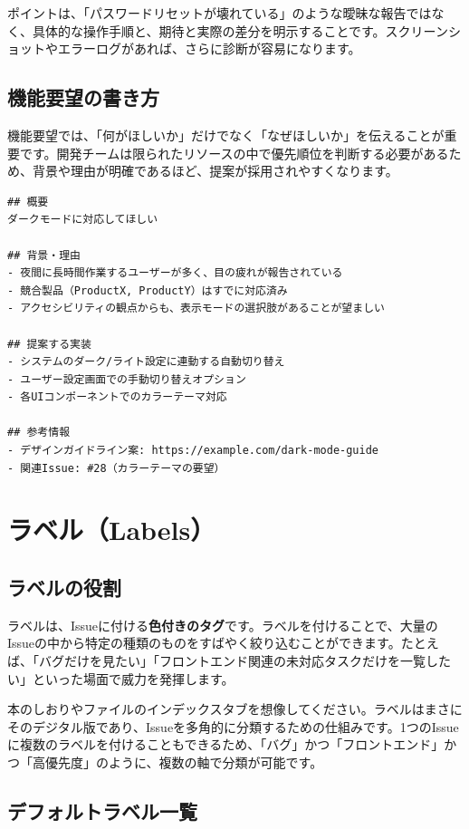 ポイントは、「パスワードリセットが壊れている」のような曖昧な報告ではなく、具体的な操作手順と、期待と実際の差分を明示することです。スクリーンショットやエラーログがあれば、さらに診断が容易になります。

\subsection{機能要望の書き方}

機能要望では、「何がほしいか」だけでなく「なぜほしいか」を伝えることが重要です。開発チームは限られたリソースの中で優先順位を判断する必要があるため、背景や理由が明確であるほど、提案が採用されやすくなります。

\begin{lstlisting}[language={}]
## 概要
ダークモードに対応してほしい

## 背景・理由
- 夜間に長時間作業するユーザーが多く、目の疲れが報告されている
- 競合製品（ProductX, ProductY）はすでに対応済み
- アクセシビリティの観点からも、表示モードの選択肢があることが望ましい

## 提案する実装
- システムのダーク/ライト設定に連動する自動切り替え
- ユーザー設定画面での手動切り替えオプション
- 各UIコンポーネントでのカラーテーマ対応

## 参考情報
- デザインガイドライン案: https://example.com/dark-mode-guide
- 関連Issue: #28（カラーテーマの要望）
\end{lstlisting}

\section{ラベル（Labels）}

\subsection{ラベルの役割}

ラベルは、Issueに付ける\textbf{色付きのタグ}です。ラベルを付けることで、大量のIssueの中から特定の種類のものをすばやく絞り込むことができます。たとえば、「バグだけを見たい」「フロントエンド関連の未対応タスクだけを一覧したい」といった場面で威力を発揮します。

本のしおりやファイルのインデックスタブを想像してください。ラベルはまさにそのデジタル版であり、Issueを多角的に分類するための仕組みです。1つのIssueに複数のラベルを付けることもできるため、「バグ」かつ「フロントエンド」かつ「高優先度」のように、複数の軸で分類が可能です。

\subsection{デフォルトラベル一覧}

